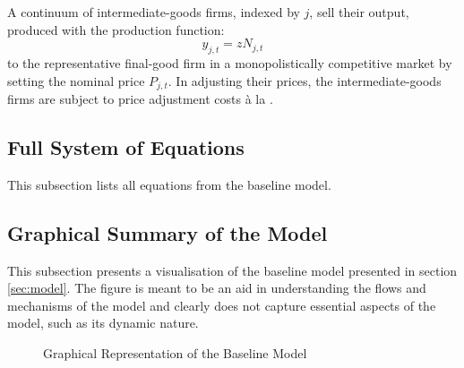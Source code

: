 \documentclass[12pt]{article} %
\numberwithin{equation}{section} %
\numberwithin{figure}{section}
\numberwithin{table}{section}
\begin{document}
\begin{refsection}
\begin{appendices}
A continuum of intermediate-goods firms, indexed by $j$, sell their output, produced with the production function:
\begin{equation}
    y_{j,t} = z N_{j,t}
\end{equation}
to the representative final-good firm in a monopolistically competitive market by setting the nominal price $P_{j,t}$. In adjusting their prices, the intermediate-goods firms are subject to price adjustment costs à la \textcite{rotemberg1982}.

\subsection{Full System of Equations}
\label{sec-app:full-equations}

This subsection lists all equations from the baseline model.

\subsection{Graphical Summary of the Model}
\label{sec-app:full-graphical}

This subsection presents a visualisation of the baseline model presented in section \ref{sec:model}. The figure is meant to be an aid in understanding the flows and mechanisms of the model and clearly does not capture essential aspects of the model, such as its dynamic nature.

\begin{figure}[H]
\centering
\caption{Graphical Representation of the Baseline Model}
\label{fig:graphical-model}
\end{figure}
\end{appendices}
\end{refsection}
\end{document}
